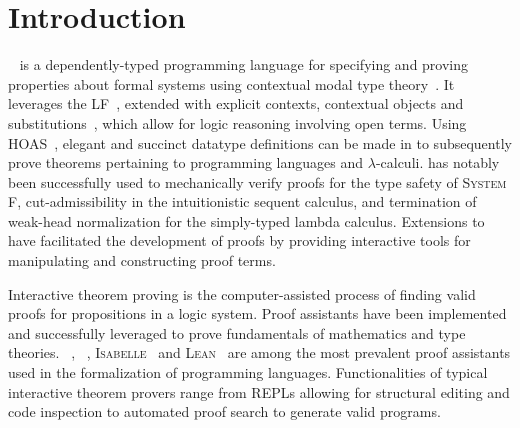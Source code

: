 \chapter{Introduction}\label{chapter:introduction}






\Beluga~\cite{pientka2010beluga} is a dependently-typed programming language for specifying and proving properties about formal systems using contextual modal type theory~\cite{nanevski2008contextual}.
It leverages the \acf{LF}~\cite{harper1993framework}, extended with explicit contexts, contextual objects and substitutions~\cite{DBLP:journals/corr/abs-1009-2789, cave2013first}, which allow for logic reasoning involving open terms.
Using \ac{HOAS}~\cite{pfenning1988higher}, elegant and succinct datatype definitions can be made in \LF to subsequently prove theorems pertaining to programming languages and $ \lambda $-calculi.
\Beluga has notably been successfully used to mechanically verify proofs for the type safety of \textsc{System F}, cut-admissibility in the intuitionistic sequent calculus, and termination of weak-head normalization for the simply-typed lambda calculus.
Extensions to \Beluga have facilitated the development of proofs by providing interactive tools for manipulating and constructing proof terms.



Interactive theorem proving is the computer-assisted process of finding valid proofs for propositions in a logic system.
Proof assistants have been implemented and successfully leveraged to prove fundamentals of mathematics and type theories.
\Agda~\cite{clffolp}, \Coq~\cite{Coq, bertot2013interactive}, \textsc{Isabelle}~\cite{nipkow2002isabelle} and \textsc{Lean}~\cite{lean4} are among the most prevalent proof assistants used in the formalization of programming languages.
Functionalities of typical interactive theorem provers range from \acp{REPL} allowing for structural editing and code inspection to automated proof search to generate valid programs.

